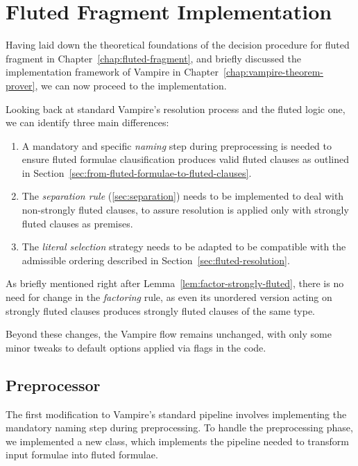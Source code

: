 \chapter{Fluted Fragment Implementation}\label{chap:fluted-fragment-implementation}

Having laid down the theoretical foundations of the decision procedure for fluted fragment in Chapter~\ref{chap:fluted-fragment}, and briefly discussed the implementation framework of Vampire in Chapter~\ref{chap:vampire-theorem-prover}, we can now proceed to the implementation.

Looking back at standard Vampire's resolution process and the fluted logic one, we can identify three main differences:
\begin{enumerate}
  \item A mandatory and specific \emph{naming} step during preprocessing is needed to ensure fluted formulae clausification produces valid fluted clauses as outlined in Section~\ref{sec:from-fluted-formulae-to-fluted-clauses}.
  \item The \emph{separation rule} (\ref{sec:separation}) needs to be implemented to deal with non-strongly fluted clauses, to assure resolution is applied only with strongly fluted clauses as premises.
  \item The \emph{literal selection} strategy needs to be adapted to be compatible with the admissible ordering described in Section~\ref{sec:fluted-resolution}.
\end{enumerate}

As briefly mentioned right after Lemma~\ref{lem:factor-strongly-fluted}, there is no need for change in the \emph{factoring} rule, as even its unordered version acting on strongly fluted clauses produces strongly fluted clauses of the same type.

Beyond these changes, the Vampire flow remains unchanged, with only some minor tweaks to default options applied via flags in the code.


\section{Preprocessor}\label{sec:preprocessor}

The first modification to Vampire's standard pipeline involves implementing the mandatory naming step during preprocessing. 
To handle the preprocessing phase, we implemented a new  class, which implements the pipeline needed to transform input formulae into fluted formulae.

